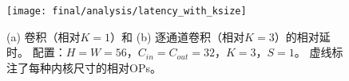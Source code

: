 \begin{figure}
    \centering
    \texttt{[image: final/analysis/latency\_with\_ksize]}
    \caption{
        (a) 卷积（相对$K=1$）和
        (b) 逐通道卷积（相对$K=3$）的相对延时。
        配置：$H=W=56$，$C_{in}=C_{out}=32$，$K=3$，$S=1$。
        虚线标注了每种内核尺寸的相对OPs。
    }
    \label{fig:latency_with_ksize}
\end{figure}